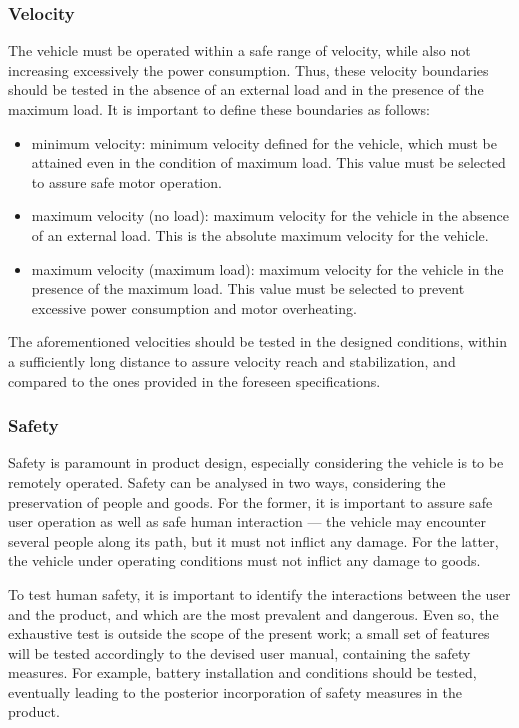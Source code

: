 \subsubsection{Velocity}%
\label{sec:org20789b4}
The vehicle must be operated within a safe range of velocity, while also not
increasing excessively the power consumption. Thus, these velocity boundaries
should be tested in the absence of an external load and in the presence of the
maximum load. It is important to define these boundaries as follows:
\begin{itemize}
\item minimum velocity: minimum velocity defined for the vehicle, which must be
  attained even in the condition of maximum load. This value must be selected to
  assure safe motor operation.
\item maximum velocity (no load): maximum velocity for the vehicle in the
  absence of an external load. This is the absolute maximum velocity for the
  vehicle.
\item maximum velocity (maximum load): maximum velocity for the vehicle in the
  presence of the maximum load. This value must be selected to prevent excessive
  power consumption and motor overheating.
\end{itemize}
The aforementioned velocities should be tested in the designed conditions,
within a sufficiently long distance to assure velocity reach and stabilization,
and compared to the ones provided in the foreseen specifications.

\subsubsection{Safety}%
\label{sec:orgf4c025f}
Safety is paramount in product design, especially considering the vehicle is to
be remotely operated. Safety can be analysed in two ways, considering the
preservation of people and goods. For the former, it is important to assure safe
user operation as well as safe human interaction --- the vehicle may encounter
several people along its path, but it must not inflict any damage. For the
latter, the vehicle under operating conditions must not inflict any damage to
goods.

To test human safety, it is important to identify the interactions between the
user and the product, and which are the most prevalent and dangerous. Even so,
the exhaustive test is outside the scope of the present work; a small set of
features will be tested accordingly to the devised user manual, containing the
safety measures. For example, battery installation and conditions should be
tested, eventually leading to the posterior incorporation of safety measures in
the product.

